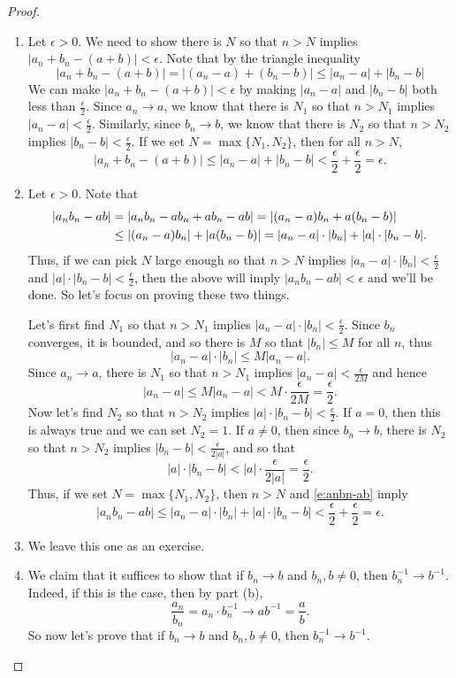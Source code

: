 \documentclass[11pt,dvipsnames]{book}
\numberwithin{figure}{section} %
\numberwithin{table}{section} %
\begin{document}
\begin{proof}
\begin{enumerate}[label=(\alph*)]
\item Let $\epsilon>0$. We need to show there is $N$ so that $n > N$ implies $|a_{n}+b_{n}-(a+b)|<\epsilon$. Note that by the triangle inequality
\[
|a_{n}+b_{n}-(a+b)|
=|(a_n-a)+(b_n-b)|
\leq |a_{n}-a|+|b_{n}-b|
\]
We can make $|a_{n}+b_{n}-(a+b)|<\epsilon$ by making $|a_{n}-a|$ and $|b_{n}-b|$ both less than $\frac{\epsilon}{2}$. Since $a_n\rightarrow a$, we know that there is $N_{1}$ so that $n > N_1$ implies $|a_{n}-a|<\frac{\epsilon}{2}$. Similarly, since $b_n\rightarrow b$, we know that there is $N_{2}$ so that $n > N_2$ implies $|b_{n}-b|<\frac{\epsilon}{2}$. If we set $N=\max\{N_1,N_2\}$, then for all $n > N$,
\[
|a_{n}+b_{n}-(a+b)|
\leq |a_{n}-a|+|b_{n}-b|
<\frac{\epsilon}{2}+\frac{\epsilon}{2}=\epsilon.
\]
\item Let $\epsilon>0$.  Note that
\begin{align}
|a_{n}b_{n}-ab|
& =|a_{n}b_{n}-ab_{n}+ab_{n}-ab|
=|(a_{n}-a)b_{n} + a(b_n-b)| \notag \\
& \leq |(a_{n}-a)b_{n}| + |a(b_n-b)|
=|a_{n}-a|\cdot |b_{n}|+ |a|\cdot |b_{n}-b|.
\label{e:anbn-ab}
\end{align}
Thus, if we can pick $N$ large enough so that $n > N$ implies  $|a_{n}-a|\cdot |b_{n}|<\frac{\epsilon}{2}$ and $|a|\cdot |b_{n}-b|<\frac{\epsilon}{2}$, then the above will imply $|a_{n}b_{n}-ab|<\epsilon$ and we'll be done. So let's focus on proving these two things.

Let's first find $N_1$ so that $n > N_1$ implies $|a_{n}-a|\cdot |b_{n}|<\frac{\epsilon}{2}$. Since $b_n$ converges, it is bounded, and so there is $M$ so that $|b_{n}|\leq M$ for all $n$, thus
\[
|a_{n}-a|\cdot |b_{n}|\leq M|a_{n}-a|.
\]
Since $a_n\rightarrow a$, there is $N_1$ so that $n > N_1$ implies $|a_{n}-a|<\frac{\epsilon}{2M}$ and hence
\[
|a_{n}-a|\leq M|a_{n}-a|<M\cdot \frac{\epsilon}{2M}=\frac{\epsilon}{2}.
\]
Now let's find $N_2$ so that $n > N_2$ implies $|a|\cdot |b_{n}-b|<\frac{\epsilon}{2}$. If $a=0$, then this is always true and we can set $N_2=1$. If $a\neq 0$, then since $b_n\rightarrow b$, there is $N_2$ so that $n > N_2$ implies $|b_{n}-b|<\frac{\epsilon}{2|a|}$, and so that
\[
|a|\cdot |b_{n}-b|<|a|\cdot \frac{\epsilon}{2|a|}=\frac{\epsilon}{2}.
\]
Thus, if we set $N=\max\{N_{1},N_{2}\}$, then $n > N$ and  \eqref{e:anbn-ab} imply
\[
|a_{n}b_{n}-ab|
\leq |a_{n}-a|\cdot |b_{n}|+ |a|\cdot |b_{n}-b|
<\frac{\epsilon}{2}+\frac{\epsilon}{2}=\epsilon.
\]
\item We leave this one as an exercise.
\item We claim that it suffices to show that if $b_n\rightarrow b$ and $b_n,b\neq 0$, then $b_{n}^{-1}\rightarrow b^{-1}$. Indeed, if this is the case, then  by part (b),
\[
\frac{a_{n}}{b_{n}}=a_{n}\cdot b_{n}^{-1} \rightarrow ab^{-1}=\frac{a}{b}.
\]
So now let's prove that if $b_n\rightarrow b$ and $b_n,b\neq 0$, then $b_{n}^{-1}\rightarrow b^{-1}$.  \\


\end{enumerate}
\end{proof}
\end{document}
